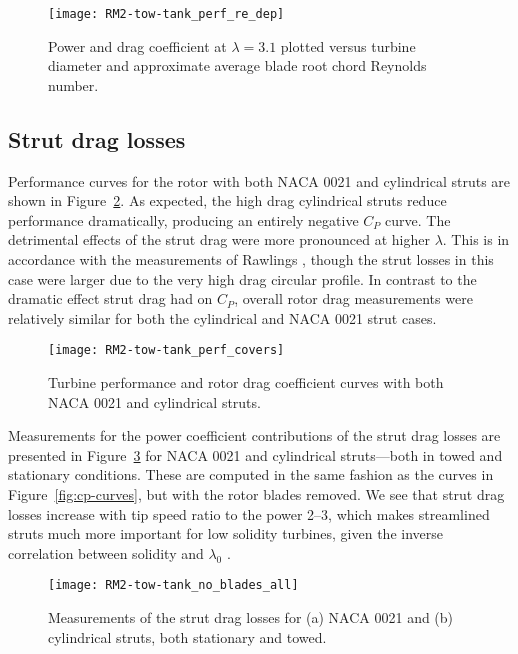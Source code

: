 \begin{figure}
    \texttt{[image: RM2-tow-tank\_perf\_re\_dep]}
    
    \caption{Power and drag coefficient at $\lambda=3.1$ plotted versus turbine
        diameter and approximate average blade root chord Reynolds number.}
    
    \label{fig:perf-re-dep}
\end{figure}


\subsection{Strut drag losses}

Performance curves for the rotor with both NACA 0021 and cylindrical struts are
shown in Figure~\ref{fig:perf-covers}. As expected, the high drag cylindrical
struts reduce performance dramatically, producing an entirely negative $C_P$
curve. The detrimental effects of the strut drag were more pronounced at higher
$\lambda$. This is in accordance with the measurements of Rawlings
\cite{Rawlings2008}, though the strut losses in this case were larger due to the
very high drag circular profile. In contrast to the dramatic effect strut drag
had on $C_P$, overall rotor drag measurements were relatively similar for both
the cylindrical and NACA 0021 strut cases.

\begin{figure}
    \centering

    \texttt{[image: RM2-tow-tank\_perf\_covers]}
    
    \caption{Turbine performance and rotor drag coefficient curves with both
        NACA 0021 and cylindrical struts.}
    
    \label{fig:perf-covers}
\end{figure}

Measurements for the power coefficient contributions of the strut drag losses
are presented in Figure~\ref{fig:no-blades} for NACA 0021 and cylindrical
struts---both in towed and stationary conditions. These are computed in the same
fashion as the curves in Figure~\ref{fig:cp-curves}, but with the rotor blades
removed. We see that strut drag losses increase with tip speed ratio to the
power 2--3, which makes streamlined struts much more important for low solidity
turbines, given the inverse correlation between solidity and $\lambda_0$
\cite{Templin1974}.

\begin{figure}
    \centering

    \texttt{[image: RM2-tow-tank\_no\_blades\_all]}
    
    \caption{Measurements of the strut drag losses for (a) NACA 0021 and (b)
        cylindrical struts, both stationary and towed.}
    
    \label{fig:no-blades}
\end{figure}

